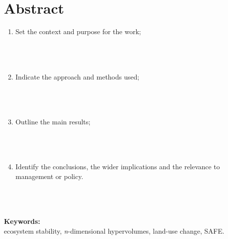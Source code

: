 \section{Abstract}

\begin{enumerate}[leftmargin=*, label=\textbf{\arabic*.}]
	\item Set the context and purpose for the work; \\ \\ \\ \\
	\item Indicate the approach and methods used; \\ \\ \\ \\
	\item Outline the main results; \\ \\ \\ \\
	\item Identify the conclusions, the wider implications and the relevance to management or policy. \\ \\ \\ \\
\end{enumerate}


\textbf{Keywords:} 
\\ ecosystem stability, \emph{n}-dimensional hypervolumes, land-use change, SAFE.